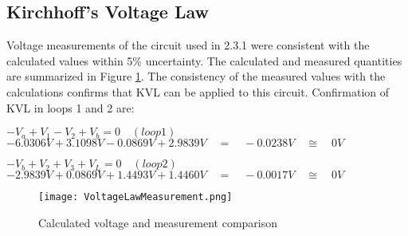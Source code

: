 \documentclass[12pt]{article}
\begin{document}

\pagebreak

\subsection{Kirchhoff's Voltage Law}
Voltage measurements of the circuit used in 2.3.1 were consistent with the calculated values 
within 5\% uncertainty. The calculated and measured quantities are summarized in Figure \ref{fig.Voltage}.
The consistency of the measured values with the calculations confirms that KVL can be applied 
to this circuit.
Confirmation of KVL in loops 1 and 2 are:

\begin{center}
	$-{ V }_{ a }+{ V }_{ 1 }-{ V }_{ 2 }+{ V }_{ b }=0\quad (loop 1)$\\
	$-6.0306V+3.1098V-0.0869V+2.9839V\quad =\quad -0.0238V\quad \cong \quad 0V$\\[1em]
\end{center}

\begin{center}
	$-{ V }_{ b }+{ V }_{ 2 }+{ V }_{ 3 }+{ V }_{ L }=0\quad (loop 2)$\\
	$-2.9839V+0.0869V+1.4493V+1.4460V\quad =\quad -0.0017V\quad \cong \quad 0V$\\[1em]
\end{center}

\begin{figure}[htbp]
	\centering
	\texttt{[image: VoltageLawMeasurement.png]}
	\caption{Calculated voltage and measurement comparison}
	\label{fig.Voltage}
\end{figure}
\end{document}
